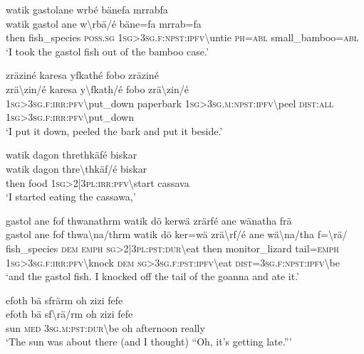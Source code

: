 \ea\label{ex:13:a1393}
watik gastolane wrbé bänefa mrrabfa\\
\gll watik	gastol	ane	w{\textbackslash}rbä/é	bäne=fa	mrrab=fa\\
     then	fish\_species	\textsc{poss}.\textsc{sg}	1\textsc{sg}>3\textsc{sg}.\textsc{f}:\textsc{npst}:\textsc{ipfv}{\textbackslash}untie	\textsc{ph}=\textsc{abl}	small\_bamboo=\textsc{abl}\\
\glt `I took the gastol fish out of the bamboo case.'
\z

\ea\label{ex:13:a1395}
zräziné karesa yfkathé fobo zräziné\\
\gll zrä{\textbackslash}zin/é	karesa	y{\textbackslash}fkath/é	fobo	zrä{\textbackslash}zin/é\\
     1\textsc{sg}>3\textsc{sg}.\textsc{f}:\textsc{irr}:\textsc{pfv}{\textbackslash}put\_down	paperbark	1\textsc{sg}>3\textsc{sg}.\textsc{m}:\textsc{npst}:\textsc{ipfv}{\textbackslash}peel	\textsc{dist}:\textsc{all}	1\textsc{sg}>3\textsc{sg}.\textsc{f}:\textsc{irr}:\textsc{pfv}{\textbackslash}put\_down\\
\glt `I put it down, peeled the bark and put it beside.'
\z

\newpage
\ea\label{ex:13:a1397}
watik dagon threthkäfé biskar\\
\gll watik	dagon	thre{\textbackslash}thkäf/é	biskar\\
     then	food	1\textsc{sg}>2|3\textsc{pl}:\textsc{irr}:\textsc{pfv}{\textbackslash}start	cassava\\
\glt `I started eating the cassawa,'
\z

\ea\label{ex:13:a1398}
gastol ane fof thwanathrm watik dö kerwä zrärfé ane wänatha frä\\
\gll gastol	ane	fof	thwa{\textbackslash}na/thrm	watik	dö	ker=wä	zrä{\textbackslash}rf/é	ane	wä{\textbackslash}na/tha	f={\textbackslash}rä/\\
     fish\_species	\textsc{dem}	\textsc{emph}	\textsc{sg}>2|3\textsc{pl}:\textsc{pst}:\textsc{dur}{\textbackslash}eat	then	monitor\_lizard	tail=\textsc{emph}	1\textsc{sg}>3\textsc{sg}.\textsc{f}:\textsc{irr}:\textsc{pfv}{\textbackslash}knock	\textsc{dem}	\textsc{sg}>3\textsc{sg}.\textsc{f}:\textsc{pst}:\textsc{ipfv}{\textbackslash}eat	\textsc{dist}=3\textsc{sg}.\textsc{f}:\textsc{npst}:\textsc{ipfv}{\textbackslash}be\\
\glt `and the gastol fish. I knocked off the tail of the goanna and ate it.'
\z

\ea\label{ex:13:a1399}
efoth bä sfrärm oh zizi fefe\\
\gll efoth	bä	sf{\textbackslash}rä/rm	oh	zizi	fefe\\
     sun	\textsc{med}	3\textsc{sg}.\textsc{m}:\textsc{pst}:\textsc{dur}{\textbackslash}be	oh	afternoon	really\\
\glt `The sun was about there (and I thought) ``Oh, it's getting late.'''
\z

